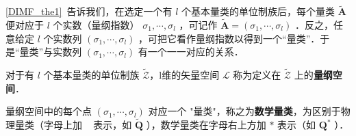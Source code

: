 
\begin{issues}
\issueTODO
\end{issues}

\autoref{DIMF_the1}~告诉我们，在选定一个有 $l$ 个基本量类的单位制族后，每个量类 $\tilde{\boldsymbol{A}}$ 便对应于 $l$ 个实数（量纲指数） $\sigma_1,\cdots,\sigma_l$ ，可记作 $\tilde{\boldsymbol{A}}=(\sigma_1,\cdots,\sigma_l)$ ．反之，任意给定 $l$ 个实数列 $(\sigma_1,\cdots,\sigma_l)$ ，可把它看作量纲指数以得到一个“量类”．于是“量类”与实数列 $(\sigma_1,\cdots,\sigma_l)$ 有一个一一对应的关系．
\begin{definition}{}
对于有 $l$ 个基本量类的单位制族 $\tilde{\mathscr{Z}}$，l维的矢量空间 $\mathscr{L}$ 称为定义在 $\tilde{\mathscr{Z}}$ 上的\textbf{量纲空间}．
\end{definition}
量纲空间中的每个点 $(\sigma_1,\cdots,\sigma_l)$ 对应一个 "量类"，称之为\textbf{数学量类}，为区别于物理量类（字母上加 ~ 表示，如 $\tilde{\boldsymbol{Q}}$ ），数学量类在字母右上方加 $*$ 表示（如 $\boldsymbol{Q}^*$ ）．